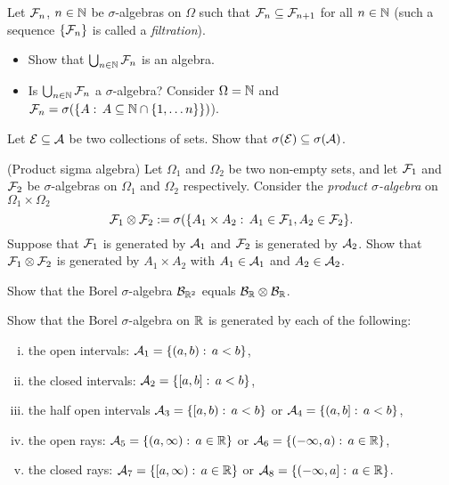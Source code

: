 \begin{problem} Let $\mathcal F_n$, $n\in \mathbb N$ be $\sigma$-algebras on $\Omega$ such that $\mathcal F_{n}\subseteq \mathcal F_{n+1}$ for all $n\in \mathbb N$ (such a sequence $\{\mathcal F_n\}$ is called a \emph{filtration}). 
    \begin{itemize}
        \item Show that $\bigcup_{n\in \mathbb N} \mathcal F_n$ is an algebra.
        \item Is $\bigcup_{n\in \mathbb N} \mathcal F_n$ a $\sigma$-algebra? Consider $\Omega=\mathbb N$ and $\mathcal F_n = \sigma(\{A:\,A\subseteq \mathbb N \cap \{1,\ldots n\}\})$).
    \end{itemize}
\end{problem}

\begin{problem}
    Let $\mathcal E\subseteq \mathcal A$ be two collections of sets. Show that $\sigma(\mathcal E) \subseteq\sigma(\mathcal A)$. 
\end{problem}

\begin{problem}(Product sigma algebra) Let $\Omega_1$ and $\Omega_2$ be two non-empty sets, and let $\mathcal F_1$ and $\mathcal F_2$ be $\sigma$-algebras on $\Omega_1$ and $\Omega_2$ respectively.
Consider the \emph{product $\sigma$-algebra} on $\Omega_1\times \Omega_2$
\begin{equation*}
    \mathcal F_1\otimes\mathcal F_2 := \sigma(\{A_1\times A_2:\, A_1\in \mathcal F_1, A_2\in \mathcal F_2\}.
\end{equation*}
Suppose that $\mathcal F_1$ is generated by $\mathcal A_1$ and $\mathcal F_2$ is generated by $\mathcal A_2$. Show that  $ \mathcal F_1\otimes\mathcal F_2$ is generated by $A_1\times A_2$ with $A_1\in \mathcal A_1$ and $A_2\in \mathcal A_2$.
\end{problem}

\begin{problem}
    Show that the Borel $\sigma$-algebra $\mathcal B_{\mathbb R^2}$ equals $\mathcal B_{\mathbb R}\otimes \mathcal B_{\mathbb R}$.
\end{problem}

\begin{problem}
    Show that the Borel $\sigma$-algebra on $\mathbb R$ is generated by each of the following:
    \begin{enumerate}[i.] 
        \item the open intervals: $\mathcal A_1 = \{(a,b):\, a<b\}$,
        \item the closed intervals: $\mathcal A_2 = \{[a,b]:\, a < b\}$,
        \item the half open intervals $\mathcal A_3 = \{[a,b):\, a < b\}$ or $\mathcal A_4 = \{(a,b]:\, a < b\}$,
        \item the open rays: $\mathcal A_5 = \{(a,\infty):\, a\in \mathbb R\}$ or $\mathcal A_6 = \{(-\infty,a):\, a\in \mathbb R\}$,
        \item the closed rays: $\mathcal A_7 = \{[a,\infty):\, a\in \mathbb R\}$ or $\mathcal A_8 = \{(-\infty,a]:\, a\in \mathbb R\}$.
    \end{enumerate}
\end{problem}

